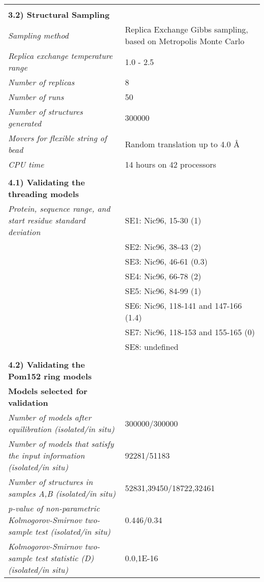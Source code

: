 \documentclass[8pt,a4paper]{article}
\begin{document}
\begin{longtable}{ p{} | p{} }
   &  \\
    \normalsize{\textbf{3.2) Structural Sampling}} & \\
    \hline
            \textit{Sampling method} & Replica Exchange Gibbs sampling, based on Metropolis Monte Carlo\\
                \textit{Replica exchange temperature range} & 1.0 - 2.5\\
                \textit{Number of replicas} & 8\\
                \textit{Number of runs} & 50\\
                \textit{Number of structures generated} & 300000\\
                \textit{Movers for flexible string of bead} & Random translation up to 4.0 \AA\\
                \textit{CPU time} & 14 hours on 42 processors\\
        
   &  \\
  
\normalsize{\textbf{4.1) Validating the threading models}} & \\
    \hline
          \textit{Protein, sequence range, and start residue standard deviation} & SE1: Nic96, 15-30 (1)\\
            & SE2: Nic96, 38-43 (2) \\
            & SE3: Nic96, 46-61 (0.3) \\
            & SE4: Nic96, 66-78 (2) \\
            & SE5: Nic96, 84-99 (1) \\
            & SE6: Nic96, 118-141 and 147-166 (1.4) \\
            & SE7: Nic96, 118-153 and 155-165 (0) \\
            & SE8: undefined \\
        
 &  \\

  \normalsize{\textbf{4.2) Validating the Pom152 ring models}} & \\
    \hline
   \textbf{Models selected for validation} & \\
    \hline
          \textit{Number of models after equilibration (isolated/in situ)} & 300000/300000\\
                \textit{Number of models that satisfy the input information (isolated/in situ)} & 92281/51183\\
                \textit{Number of structures in samples A,B (isolated/in situ)} & 52831,39450/18722,32461\\
                \textit{p-value of non-parametric Kolmogorov-Smirnov two-sample test (isolated/in situ)} & 0.446/0.34\\
                \textit{Kolmogorov-Smirnov two-sample test statistic (D) (isolated/in situ)} & 0.0,1E-16\\
           \hline
    

\end{longtable}
\end{document}
